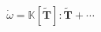 \documentclass[preview]{standalone}
\begin{document}
\begin{align*}
\dot{\omega} = \mathbb{K}[\tilde{\mathbf{T}}] : \tilde{\mathbf{T}} + \cdots
\end{align*}
\end{document}
